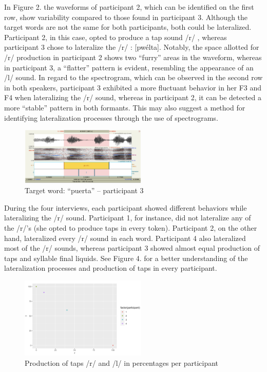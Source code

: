\documentclass[
  a4paper,
  11pt,
  twocolumn]{article}
\begin{document}
In Figure 2. the waveforms of participant 2, which can be identified on
the first row, show variability compared to those found in participant
3. Although the target words are not the same for both participants,
both could be lateralized. Participant 2, in this case, opted to produce
a tap sound /r/ , whereas participant 3 chose to lateralize the /r/ :
{[}pwélta{]}. Notably, the space allotted for /r/ production in
participant 2 shows two ``furry'' areas in the waveform, whereas in
participant 3, a ``flatter'' pattern is evident, resembling the
appearance of an /l/ sound. In regard to the spectrogram, which can be
observed in the second row in both speakers, participant 3 exhibited a
more fluctuant behavior in her F3 and F4 when lateralizing the /r/
sound, whereas in participant 2, it can be detected a more ``stable''
pattern in both formants. This may also suggest a method for identifying
lateralization processes through the use of spectrograms.

\begin{figure}[!ht]
\begin{center}
\includegraphics[width=6cm]{./includes/figures/praat1.png}
\caption{Target word: “puerta” – participant 3}\label{fig:vowels}
\end{center}
\end{figure}

During the four interviews, each participant showed different behaviors
while lateralizing the /r/ sound. Participant 1, for instance, did not
lateralize any of the /r/'s (she opted to produce taps in every token).
Participant 2, on the other hand, lateralized every /r/ sound in each
word. Participant 4 also lateralized most of the /r/ sounds, whereas
participant 3 showed almost equal production of taps and syllable final
liquids. See Figure 4. for a better understanding of the lateralization
processes and production of taps in every participant.

\begin{figure}[!ht]
\begin{center}
\includegraphics[width=6cm]{./includes/figures/graph.png}
\caption{Production of taps /r/ and /l/ in percentages per participant}\label{fig:vowels}
\end{center}
\end{figure}
\end{document}
